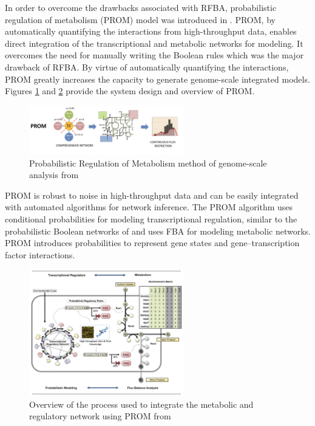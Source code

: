\documentclass[12pt,chapterheads]{ucsd}
\begin{document}
In order to overcome the drawbacks associated with RFBA, probabilistic regulation of metabolism (PROM) model was introduced in \cite{Chandrasekaran17845}. PROM, by automatically quantifying the interactions from high-throughput data, enables direct integration of the transcriptional and metabolic networks for modeling. It overcomes the need for manually writing the Boolean rules which was the major drawback of RFBA. By virtue of automatically quantifying the interactions, PROM greatly increases the capacity to generate genome-scale integrated models. Figures \ref{fig:prom_mech} and \ref{fig:prom_attr}  provide the system design and overview of PROM.

\begin{figure}[h] 
\centering
\includegraphics[width=0.6\textwidth]{Figures/prom_mech}
\caption[Probabilistic Regulation of Metabolism method of genome-scale analysis]
{Probabilistic Regulation of Metabolism method of genome-scale analysis from \cite{Chandrasekaran17845}}
\label{fig:prom_mech}
\end{figure}

PROM is robust to noise in high-throughput data and can be easily integrated with automated algorithms for network inference. The PROM algorithm uses conditional probabilities for modeling transcriptional regulation, similar to the probabilistic Boolean networks of \cite{pmid11847074} and uses FBA \cite{pmid14580578} for modeling metabolic networks. PROM introduces probabilities to represent gene states and gene–transcription factor interactions. 

\begin{figure}[h] 
\centering
\includegraphics[width=0.6\textwidth]{Figures/Prom_appr}
\caption[Overview of the process used to integrate the metabolic and regulatory network using PROM]
{Overview of the process used to integrate the metabolic and regulatory network using PROM from \cite{Chandrasekaran17845}}
\label{fig:prom_attr}
\end{figure}
\end{document}
